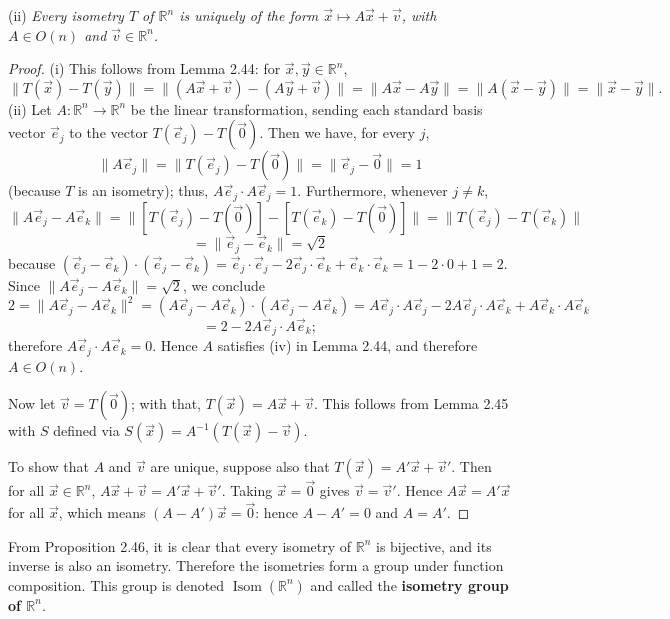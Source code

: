 \documentclass[leqno]{book}
\begin{document}
(ii) \emph{Every isometry $T$ of $\mathbb R^n$ is uniquely of the form $\vec x\mapsto A\vec x+\vec v$, with $A\in O(n)$ and $\vec v\in\mathbb R^n$.}
\begin{proof}
(i) This follows from Lemma 2.44: for $\vec x,\vec y\in\mathbb R^n$,
$$\|T(\vec x)-T(\vec y)\|=\|(A\vec x+\vec v)-(A\vec y+\vec v)\|=\|A\vec x-A\vec y\|=\|A(\vec x-\vec y)\|=\|\vec x-\vec y\|.$$
(ii) Let $A:\mathbb R^n\to\mathbb R^n$ be the linear transformation, sending each standard basis vector $\vec e_j$ to the vector $T(\vec e_j)-T(\vec 0)$.  Then we have, for every $j$, %
$$\|A\vec e_j\|=\|T(\vec e_j)-T(\vec 0)\|=\|\vec e_j-\vec 0\|=1$$
(because $T$ is an isometry); thus, $A\vec e_j\cdot A\vec e_j=1$.  Furthermore, whenever $j\ne k$,
$$\|A\vec e_j-A\vec e_k\|=\|[T(\vec e_j)-T(\vec 0)]-[T(\vec e_k)-T(\vec 0)]\|=\|T(\vec e_j)-T(\vec e_k)\|$$
$$=\|\vec e_j-\vec e_k\|=\sqrt 2$$
because $(\vec e_j-\vec e_k)\cdot(\vec e_j-\vec e_k)=\vec e_j\cdot\vec e_j-2\vec e_j\cdot\vec e_k+\vec e_k\cdot\vec e_k=1-2\cdot 0+1=2$.  Since $\|A\vec e_j-A\vec e_k\|=\sqrt 2$, we conclude
$$2=\|A\vec e_j-A\vec e_k\|^2=(A\vec e_j-A\vec e_k)\cdot(A\vec e_j-A\vec e_k)=A\vec e_j\cdot A\vec e_j-2A\vec e_j\cdot A\vec e_k+A\vec e_k\cdot A\vec e_k$$
$$=2-2A\vec e_j\cdot A\vec e_k;$$
therefore $A\vec e_j\cdot A\vec e_k=0$.  Hence $A$ satisfies (iv) in Lemma 2.44, and therefore $A\in O(n)$.

Now let $\vec v=T(\vec 0)$; with that, $T(\vec x)=A\vec x+\vec v$.  This follows from Lemma 2.45 with $S$ defined via $S(\vec x)=A^{-1}(T(\vec x)-\vec v)$.

To show that $A$ and $\vec v$ are unique, suppose also that $T(\vec x)=A'\vec x+\vec v'$.  Then for all $\vec x\in\mathbb R^n$, $A\vec x+\vec v=A'\vec x+\vec v'$.  Taking $\vec x=\vec 0$ gives $\vec v=\vec v'$.  Hence $A\vec x=A'\vec x$ for all $\vec x$, which means $(A-A')\vec x=\vec 0$: hence $A-A'=0$ and $A=A'$.
\end{proof}

\noindent From Proposition 2.46, it is clear that every isometry of $\mathbb R^n$ is bijective, and its inverse is also an isometry.  Therefore the isometries form a group under function composition.  This group is denoted $\operatorname{Isom}(\mathbb R^n)$ and called the \textbf{isometry group of $\mathbb R^n$}.
\end{document}

